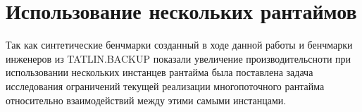 
\section{Использование нескольких рантаймов}

Так как синтетические бенчмарки созданный в ходе данной работы и бенчмарки инженеров из TATLIN.BACKUP показали увеличение производительсноти при использовании нескольких инстанцев рантайма была поставлена задача исследования ограничений текущей реализации многопоточного рантайма относительно взаимодействий между этими самыми инстанцами.
